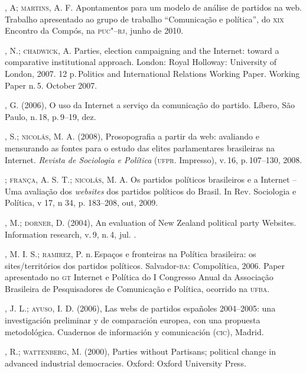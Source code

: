 \begin{bibliohedra}
, A; \textsc{martins}, A. F. Apontamentos para um modelo de análise
de partidos na web. Trabalho apresentado ao grupo de trabalho
``Comunicação e política'', do \textsc{xix} Encontro da Compós, na \textsc{puc"--rj}, junho
de 2010. 

, N.; \textsc{chadwick}, A. Parties, election campaigning and the
Internet: toward a comparative institutional approach. London: Royal
Holloway: University of London, 2007. 12 p.\,Politics and International
Relations Working Paper. Working Paper n.\,5. October 2007.

, G. (2006), O uso da Internet a serviço da comunicação do
partido. Líbero, São Paulo, n.\,18, p.\,9--19, dez.

, S.; \textsc{nicolás}, M. A. (2008), Prosopografia a partir da web:
avaliando e mensurando as fontes para o estudo das elites parlamentares
brasileiras na Internet. \textit{Revista de Sociologia e Política} (\textsc{ufpr}.
Impresso), v.\,16, p.\,107--130, 2008.

\titidem; \textsc{frança}, A. S. T.; \textsc{nicolás}, M. A. Os partidos políticos
brasileiros e a Internet -- Uma avaliação dos \textit{websites} dos partidos
políticos do Brasil. In Rev. Sociologia e Política, v 17, n 34, p.
183--208, out, 2009. 


, M.; \textsc{dorner}, D. (2004), An evaluation of New Zealand political
party Websites. Information research, v.\,9, n.\,4, jul. .

, M. I. S.; \textsc{ramirez}, P. n.\,Espaços e fronteiras na Política
brasileira: os sites/territórios dos partidos políticos. Salvador-\textsc{ba}:
Compolítica, 2006. Paper apresentado no \textsc{gt} Internet e Política do I
Congresso Anual da Associação Brasileira de Pesquisadores de Comunicação
e Política, ocorrido na \textsc{ufba}.

, J. L.; \textsc{ayuso}, I. D. (2006), Las webs de partidos españoles
2004--2005: una investigación preliminar y de comparación europea, con
una propuesta metodológica. Cuadernos de información y comunicación
(\textsc{cic}), Madrid.

, R.; \textsc{wattenberg}, M. (2000), Parties without Partisans; political
change in advanced industrial democracies. Oxford: Oxford University
Press.


\end{bibliohedra}
